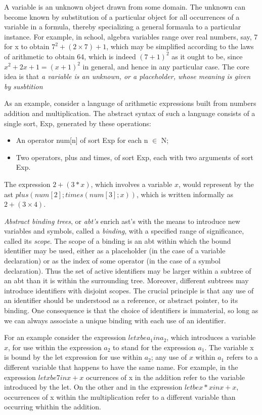 A variable is an unknown object drawn from some domain. The unknown can
become known by substitution of a particular object for all occurrences of
a variable in a formula, thereby specializing a general formaula to a
particular instance. For example, in school, algebra variables range over
real numbers, say, 7 for x to obtain $7^2 + (2 \times 7) + 1$, which may be
simplified according to the laws of arithmetic to obtain 64, which is
indeed ${(7+1)}^2$ as it ought to be, since $x^2 + 2x + 1 = {(x + 1)}^2$ in
general, and hence in any particular case. The core idea is that \textit{a
variable is an unknown, or a placeholder, whose meaning is given by
susbtition}

As an example, consider a language of arithmetic expressions built from numbers
addition and multiplication. The abstract syntax of such a language consists of
a single sort, Exp, generated by these operations:

\begin{itemize}
    \item An operator num[n] of sort Exp for each n $\in$ N\@;
    \item Two operators, plus and times, of sort Exp, each with two
    arguments of sort Exp.
\end{itemize}

The expression $2+(3 * x)$, which involves a variable $x$, would represent by
the ast $plus(num[2]; times(num[3]; x))$, which is written informally as $2 +
(3 \times 4)$.  

\textit{Abstract binding trees}, or \textit{abt's} enrich ast's with
the means to introduce new variables and symbols, called a
\textit{binding}, with a specified range of significance, called its
\textit{scope}. The scope of a binding is an abt within which the bound
identifier may be used, either as a placeholder (in the case of a
variable declaration) or as the index of some operator (in the case of
a symbol declaration). Thus the set of active identifiers may be larger
within a subtree of an abt than it is within the surrounding tree.
Moreover, different subtrees may introduce identifiers with disjoint
scopes. The crucial principle is that any use of an identifier should
be understood as a reference, or abstract pointer, to its binding. One
consequence is that the choice of identifiers is immaterial, so long as
we can always associate a unique binding with each use of an
identifier.

For an example consider the expression $let x be a_1 in a_2$, which
introduces a variable $x$, for use within the expression $a_2$ to stand
for the expression $a_1$. The variable x is bound by the let expression
for use within $a_2$; any use of $x$ within $a_1$ refers to a different
variable that happens to have the same name. For example, in the
expression $let x be 7 in x+x$ ocurrences of x in the addition refer to
the variable introduced by the let. On the other and in the expression
$let be x*x in x+x$, occurrences of x within the multiplication refer
to a different variable than occurring whithin the addition.

